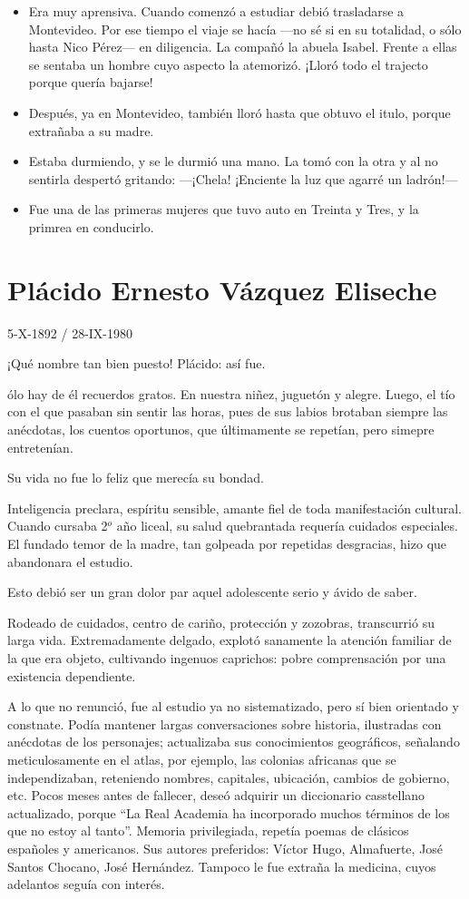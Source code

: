\documentclass{article}
\begin{document}
\begin{itemize}
    \item{Era muy aprensiva. Cuando comenzó a estudiar debió trasladarse a Montevideo. Por ese tiempo el viaje se hacía ---no sé si en su totalidad, o sólo hasta Nico Pérez--- en diligencia. La compañó la abuela Isabel. Frente a ellas se sentaba un hombre cuyo aspecto la atemorizó. ¡Lloró todo el trajecto porque quería bajarse!}
    \item{Después, ya en Montevideo, también lloró hasta que obtuvo el itulo, porque extrañaba a su madre.}
    \item{Estaba durmiendo, y se le durmió una mano. La tomó con la otra y al  no sentirla despertó gritando: ---¡Chela! ¡Enciente la luz que agarré un ladrón!---}
    \item{Fue una de las primeras mujeres que tuvo auto en Treinta y Tres, y la primrea en conducirlo.}
\end{itemize}

\section{Plácido Ernesto Vázquez Eliseche}

5-X-1892 / 28-IX-1980

¡Qué nombre tan bien puesto! Plácido: así fue.

ólo hay de él recuerdos gratos. En nuestra niñez, juguetón y alegre. Luego, el tío con el que pasaban sin sentir las horas, pues de sus labios brotaban siempre las anécdotas, los cuentos oportunos, que últimamente se repetían, pero simepre entretenían.

Su vida no fue lo feliz que merecía su bondad.

Inteligencia preclara, espíritu sensible, amante fiel de toda manifestación cultural. Cuando cursaba 2$^o$ año liceal, su salud quebrantada requería cuidados especiales. El fundado temor de la madre, tan golpeada por repetidas desgracias, hizo que abandonara el estudio.

Esto debió ser un gran dolor par aquel adolescente serio y ávido de saber.

Rodeado de cuidados, centro de cariño, protección y zozobras, transcurrió su larga vida. Extremadamente delgado, explotó sanamente la atención familiar de la que era objeto, cultivando ingenuos caprichos: pobre comprensación por una existencia dependiente.

A lo que no renunció, fue al estudio ya no sistematizado, pero sí bien orientado y constnate. Podía mantener largas conversaciones sobre historia, ilustradas con anécdotas de los personajes; actualizaba sus conocimientos geográficos, señalando meticulosamente en el atlas, por ejemplo, las colonias africanas que se independizaban, reteniendo nombres, capitales, ubicación, cambios de gobierno, etc. Pocos meses antes de fallecer, deseó adquirir un diccionario casstellano actualizado, porque ``La Real Academia ha incorporado muchos términos de los que no estoy al tanto''. Memoria privilegiada, repetía poemas de clásicos españoles y americanos. Sus autores preferidos: Víctor Hugo, Almafuerte, José Santos Chocano, José Hernández. Tampoco le fue extraña la medicina, cuyos adelantos seguía con interés.
\end{document}

